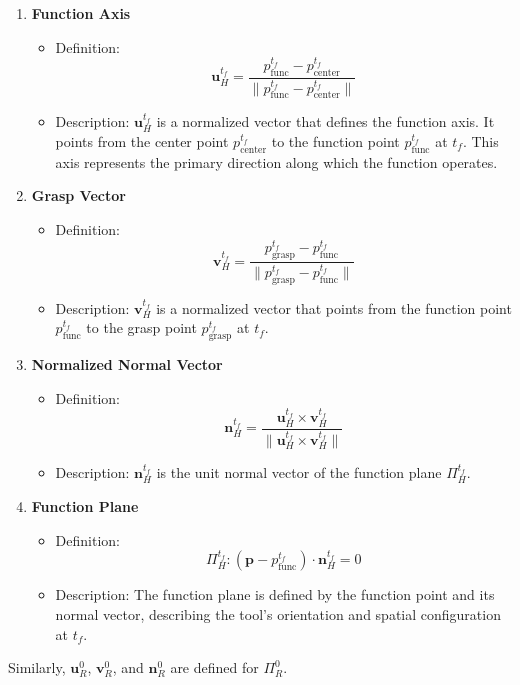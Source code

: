 \begin{enumerate}
    \item \textbf{Function Axis} 
    \begin{itemize}
        \item Definition: \[
    \mathbf{u}_H^{t_f} = \frac{p_{\text{func}}^{t_f} - p_{\text{center}}^{t_f}}{\|p_{\text{func}}^{t_f} - p_{\text{center}}^{t_f}\|}
    \]
    \item Description:  $\mathbf{u}_H^{t_f}$  is a normalized vector that defines the function axis. It points from the center point $p_{\text{center}}^{t_f}$ to the function point $p_{\text{func}}^{t_f}$ at $t_f$. This axis represents the primary direction along which the function operates.    
    \end{itemize}
    \item \textbf{Grasp Vector}
    \begin{itemize}
        \item Definition: \[  
    \mathbf{v}_H^{t_f} = \frac{p_{\text{grasp}}^{t_f} - p_{\text{func}}^{t_f}}{\|p_{\text{grasp}}^{t_f} - p_{\text{func}}^{t_f}\|}
        \]
    \item Description: $\mathbf{v}_H^{t_f}$  is a normalized vector that points from the function point $p_{\text{func}}^{t_f}$ to the grasp point $p_{\text{grasp}}^{t_f}$ at $t_f$.
    \end{itemize}
    \item \textbf{Normalized Normal Vector}
    \begin{itemize}
        \item Definition:
        \[ 
    \mathbf{n}_H^{t_f} = \frac{\mathbf{u}_H^{t_f} \times \mathbf{v}_H^{t_f}}{\| \mathbf{u}_H^{t_f} \times \mathbf{v}_H^{t_f} \|}
        \]
        \item Description: $\mathbf{n}_H^{t_f}$ is the unit normal vector of the function plane $\Pi_H^{t_f}$.
    \end{itemize}
    \item \textbf{Function Plane}
    \begin{itemize}
        \item Definition:
        \[   
    \Pi_H^{t_f}: (\mathbf{p} - p_{\text{func}}^{t_f}) \cdot \mathbf{n}_H^{t_f} = 0
        \]
        \item Description: The function plane is defined by the function point and its normal vector, describing the tool’s orientation and spatial configuration at $t_f$. 
    \end{itemize}
\end{enumerate}
Similarly, \(\mathbf{u}_R^0\), \(\mathbf{v}_R^0\), and \(\mathbf{n}_R^0\) are defined for \( \Pi_R^0 \).\\


